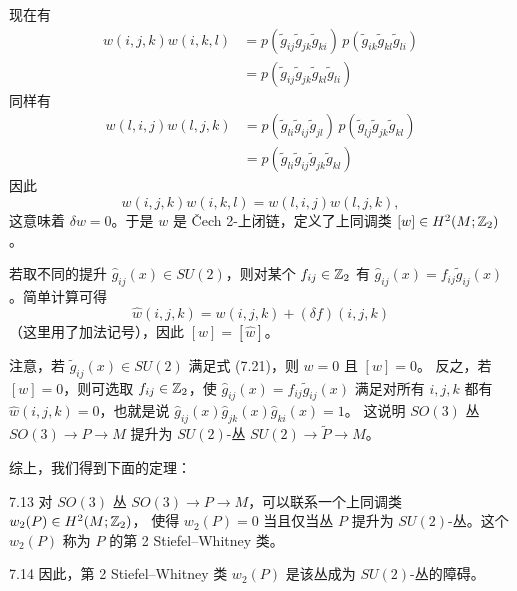 现在有
\begin{equation}
\begin{split}
w(i,j,k)w(i,k,l)&=p(\tilde g_{ij}\tilde g_{jk}\tilde g_{ki})\,p(\tilde g_{ik}\tilde g_{kl}\tilde g_{li})\\
&=p(\tilde g_{ij}\tilde g_{jk}\tilde g_{kl}\tilde g_{li})
\end{split}
\tag{7.25}
\end{equation}
同样有
\begin{equation}
\begin{split}
w(l,i,j)w(l,j,k)&=p(\tilde g_{li}\tilde g_{ij}\tilde g_{jl})\,p(\tilde g_{lj}\tilde g_{jk}\tilde g_{kl})\\
&=p(\tilde g_{li}\tilde g_{ij}\tilde g_{jk}\tilde g_{kl})
\end{split}
\tag{7.26}
\end{equation}
因此
\begin{equation}
w(i,j,k)w(i,k,l)=w(l,i,j)w(l,j,k),
\tag{7.27}
\end{equation}
这意味着 $\delta w=0$。于是 $w$ 是 Čech 2-上闭链，定义了上同调类 $[w]\in H^2(M;\mathbb{Z}_2)$。

若取不同的提升 $\hat g_{ij}(x)\in SU(2)$，则对某个 $f_{ij}\in\mathbb{Z}_2$ 有
$\hat g_{ij}(x)=f_{ij}\tilde g_{ij}(x)$。简单计算可得
\begin{equation}
\hat w(i,j,k)=w(i,j,k)+(\delta f)(i,j,k)
\tag{7.28}
\end{equation}
（这里用了加法记号），因此 $[w]=[\hat w]$。

注意，若 $\tilde g_{ij}(x)\in SU(2)$ 满足式 (7.21)，则 $w=0$ 且 $[w]=0$。
反之，若 $[w]=0$，则可选取 $f_{ij}\in\mathbb{Z}_2$，使 $\hat g_{ij}(x)=f_{ij}\tilde g_{ij}(x)$
满足对所有 $i,j,k$ 都有 $\hat w(i,j,k)=0$，也就是说 $\hat g_{ij}(x)\hat g_{jk}(x)\hat g_{ki}(x)=1$。
这说明 $SO(3)$ 丛 $SO(3)\to P\to M$ 提升为 $SU(2)$-丛 $SU(2)\to\tilde P\to M$。

综上，我们得到下面的定理：

\begin{theorem}{7.13}
对 $SO(3)$ 丛 $SO(3)\to P\to M$，可以联系一个上同调类 $w_2(P)\in H^2(M;\mathbb{Z}_2)$，
使得 $w_2(P)=0$ 当且仅当丛 $P$ 提升为 $SU(2)$-丛。这个 $w_2(P)$ 称为 $P$ 的第 2 Stiefel--Whitney 类。
\end{theorem}

\begin{remark}{7.14}
因此，第 2 Stiefel--Whitney 类 $w_2(P)$ 是该丛成为 $SU(2)$-丛的障碍。
\end{remark}

